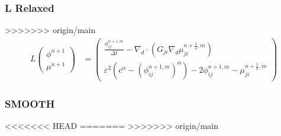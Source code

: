 \documentclass[11pt]{article}
\begin{document}
\subsubsection{L Relaxed}
\label{sec:org93b82d1}
>>>>>>> origin/main
\begin{align*}
L
\begin{pmatrix}
\phi ^{n+1} \\
\mu^{n+1}
\end{pmatrix}
&=
\begin{pmatrix}
\frac{\phi^{n+1,m}_{ij}}{\Delta t} - \nabla _d \cdot (G_{ji} \nabla _d \mu^{n + \frac{1}{2},m}_{ji}) \\
\varepsilon ^2 (c^\alpha - (\phi^{n+1,m}_{ij})^\alpha) - 2\phi ^{n+1,m}_{ij} -\mu^{n + \frac{1}{2},m}_{ji}
\end{pmatrix}
\end{align*}
\subsubsection{SMOOTH}
<<<<<<< HEAD
\label{sec:org69bd372}
=======
\label{sec:org6e6768b}
>>>>>>> origin/main
\end{document}
